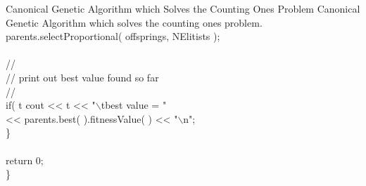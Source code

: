 \begin{programlisting}{Canonical Genetic Algorithm which Solves the Counting Ones Problem}{
    Canonical Genetic Algorithm which solves the counting ones problem.}
        parents.selectProportional( offsprings, NElitists );\\
\\
        //\\
        // print out best value found so far\\
        //\\
        if( t %
            cout << t << "$\backslash$tbest value = "\\
                 << parents.best( ).fitnessValue( ) << "$\backslash$n";\\
    \}\\
\\
    return 0;\\
\}\\
\end{programlisting}

